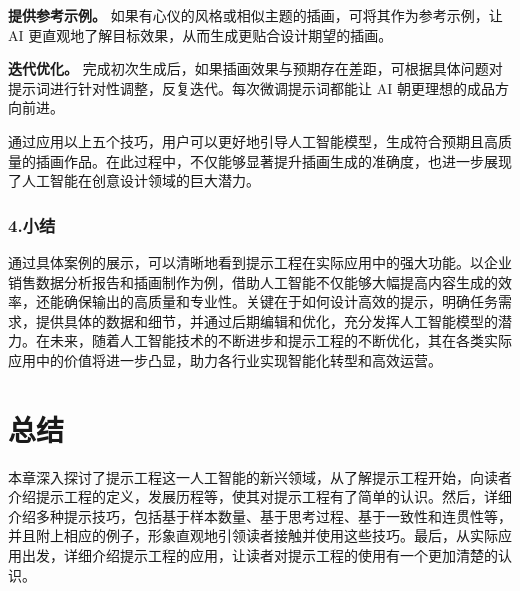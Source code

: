 \textbf{提供参考示例。} 如果有心仪的风格或相似主题的插画，可将其作为参考示例，让 AI 更直观地了解目标效果，从而生成更贴合设计期望的插画。

\textbf{迭代优化。} 完成初次生成后，如果插画效果与预期存在差距，可根据具体问题对提示词进行针对性调整，反复迭代。每次微调提示词都能让 AI 朝更理想的成品方向前进。

通过应用以上五个技巧，用户可以更好地引导人工智能模型，生成符合预期且高质量的插画作品。在此过程中，不仅能够显著提升插画生成的准确度，也进一步展现了人工智能在创意设计领域的巨大潜力。

\subsubsection{4.小结}

通过具体案例的展示，可以清晰地看到提示工程在实际应用中的强大功能。以企业销售数据分析报告和插画制作为例，借助人工智能不仅能够大幅提高内容生成的效率，还能确保输出的高质量和专业性。关键在于如何设计高效的提示，明确任务需求，提供具体的数据和细节，并通过后期编辑和优化，充分发挥人工智能模型的潜力。在未来，随着人工智能技术的不断进步和提示工程的不断优化，其在各类实际应用中的价值将进一步凸显，助力各行业实现智能化转型和高效运营。

\section{总结}

本章深入探讨了提示工程这一人工智能的新兴领域，从了解提示工程开始，向读者介绍提示工程的定义，发展历程等，使其对提示工程有了简单的认识。然后，详细介绍多种提示技巧，包括基于样本数量、基于思考过程、基于一致性和连贯性等，并且附上相应的例子，形象直观地引领读者接触并使用这些技巧。最后，从实际应用出发，详细介绍提示工程的应用，让读者对提示工程的使用有一个更加清楚的认识。

